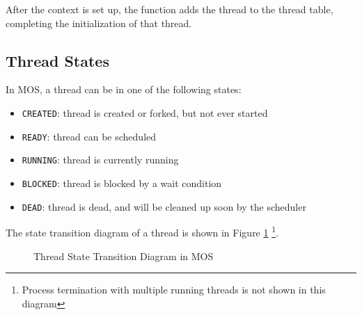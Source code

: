 After the context is set up, the function adds the thread to the thread table, completing
the initialization of that thread.

\subsection{Thread States}

In MOS, a thread can be in one of the following states:

\begin{itemize}
    \item \texttt{CREATED}: thread is created or forked, but not ever started
    \item \texttt{READY}: thread can be scheduled
    \item \texttt{RUNNING}: thread is currently running
    \item \texttt{BLOCKED}: thread is blocked by a wait condition
    \item \texttt{DEAD}: thread is dead, and will be cleaned up soon by the scheduler
\end{itemize}

The state transition diagram of a thread is shown in Figure \ref{fig:thread-state-transition}
\footnote{Process termination with multiple running threads is not shown in this diagram}.

\begin{figure}
    \centering
    \caption{Thread State Transition Diagram in MOS}
    \label{fig:thread-state-transition}
\end{figure}

